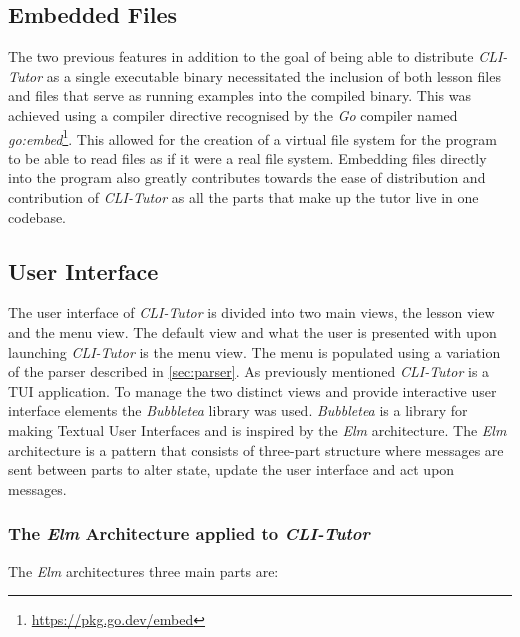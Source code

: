 
\subsection{Embedded Files}

The two previous features in addition to the goal of being able to distribute
\textit{CLI-Tutor} as a single executable binary necessitated the inclusion of
both lesson files and files that serve as running examples into the compiled
binary. This was achieved using a compiler directive recognised by the \textit{Go}
compiler named \textit{go:embed}\footnote{\url{https://pkg.go.dev/embed}}. This
allowed for the creation of a virtual file system for the program to be able to
read files as if it were a real file system. Embedding files directly into
the program also greatly contributes towards the ease of distribution and
contribution of \textit{CLI-Tutor} as all the parts that make up the tutor live
in one codebase.

\subsection{User Interface}

The user interface of \textit{CLI-Tutor} is divided into two main views, the
lesson view and the menu view. The default view and what the user is presented with
upon launching \textit{CLI-Tutor} is the menu view. The menu is populated using
a variation of the parser described in \autoref{sec:parser}. As previously
mentioned \textit{CLI-Tutor} is a TUI application. To manage the two distinct
views and provide interactive user interface elements the \textit{Bubbletea}
library was used. \textit{Bubbletea} is a library for making Textual User
Interfaces and is inspired by the \textit{Elm} architecture. The \textit{Elm}
architecture is a pattern that consists of three-part structure where messages
are sent between parts to alter state, update the user interface and act upon
messages.

\subsubsection{The \textit{Elm} Architecture applied to \textit{CLI-Tutor}} 

The \textit{Elm} architectures three main parts are:

